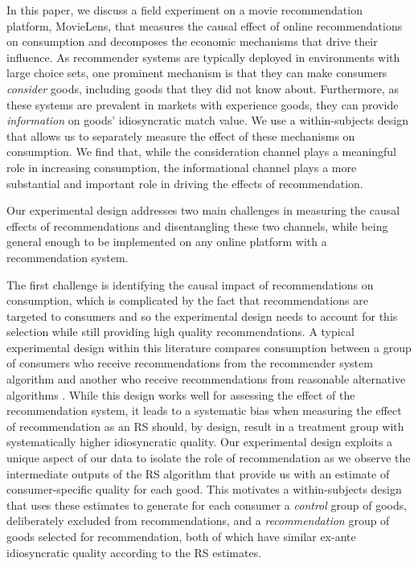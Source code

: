 \documentclass[12pt]{article}
\theoremstyle{newtheorem}
\begin{document}
In this paper, we discuss a field experiment on a movie recommendation platform, MovieLens, that measures the causal effect of online recommendations on consumption and decomposes the economic mechanisms that drive their influence. 
As recommender systems are typically deployed in environments with large choice sets, one prominent mechanism is that they can make consumers \emph{consider} goods, including goods that they did not know about. 
Furthermore, as these systems are prevalent in markets with experience goods, they can provide \emph{information} on goods' idiosyncratic match value. 
We use a within-subjects design that allows us to separately measure the effect of these mechanisms on consumption. 
We find that, while the consideration channel plays a meaningful role in increasing consumption, the informational channel plays a more substantial and important role in driving the effects of recommendation. 


Our experimental design addresses two main challenges in measuring the causal effects of recommendations and disentangling these two channels, while being general enough to be implemented on any online platform with a recommendation system.


The first challenge is identifying the causal impact of recommendations on consumption, which is complicated by the fact that recommendations are targeted to consumers and so the experimental design needs to account for this selection while still providing high quality recommendations. 
A typical experimental design within this literature compares consumption between a group of consumers who receive recommendations from the recommender system algorithm and another who receive recommendations from reasonable alternative algorithms \citep{HoltzCarteretteChandarNazariCramerAral2020WP, KorganbekovaZuber2023WP}. 
While this design works well for assessing the effect of the recommendation system, it leads to a systematic bias when measuring the effect of recommendation as an RS should, by design, result in a treatment group with systematically higher idiosyncratic quality. 
Our experimental design exploits a unique aspect of our data to isolate the role of recommendation as we observe the intermediate outputs of the RS algorithm that provide us with an estimate of consumer-specific quality for each good. 
This motivates a within-subjects design that uses these estimates to generate for each consumer a \emph{control} group of goods, deliberately excluded from recommendations, and a \emph{recommendation} group of goods selected for recommendation, both of which have similar ex-ante idiosyncratic quality according to the RS estimates.
\end{document}
